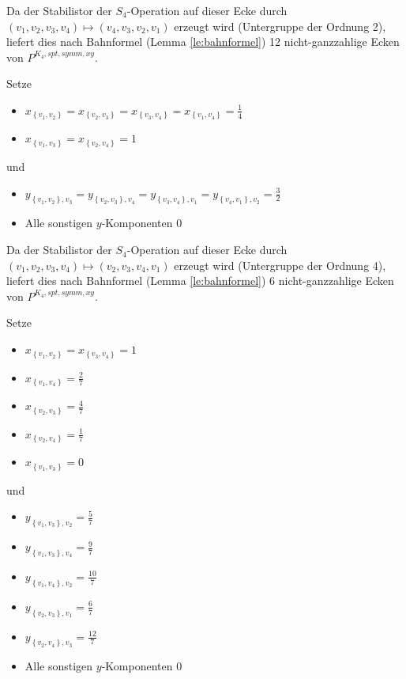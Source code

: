 \documentclass[10p,a4paper,BCOR = 12mm, DIV=15]{scrbook}
\begin{document}
{\begin{Bem}
Da der Stabilistor der $S_4$-Operation auf dieser Ecke durch $\left(v_1, v_2, v_3, v_4\right) \mapsto \left(v_4, v_3, v_2, v_1\right)$ erzeugt wird (Untergruppe der Ordnung 2), liefert dies nach Bahnformel (Lemma \ref{le:bahnformel}) 12 nicht-ganzzahlige Ecken von $P^{K_4, spt, symm, xy}$.
\end{Bem}

\begin{Bem}
Setze
\begin{itemize}
\item $x_{\left\{v_1, v_2\right\}} = x_{\left\{v_2, v_3\right\}} = x_{\left\{v_3, v_4\right\}} = x_{\left\{v_1, v_4\right\}} = \frac{1}{4}$
\item $x_{\left\{v_1, v_3\right\}} = x_{\left\{v_2, v_4\right\}} = 1$
\end{itemize}
und
\begin{itemize}
\item  $y_{\left\{v_1, v_2\right\}, v_3} = y_{\left\{v_2, v_3\right\}, v_4} = y_{\left\{v_3, v_4\right\}, v_1} = y_{\left\{v_4, v_1\right\}, v_2} = \frac{3}{2}$
\item Alle sonstigen $y$-Komponenten $0$
\end{itemize}

Da der Stabilistor der $S_4$-Operation auf dieser Ecke durch $\left(v_1, v_2, v_3, v_4\right) \mapsto \left(v_2, v_3, v_4, v_1\right)$ erzeugt wird (Untergruppe der Ordnung 4), liefert dies nach Bahnformel (Lemma \ref{le:bahnformel}) 6 nicht-ganzzahlige Ecken von $P^{K_4, spt, symm, xy}$.
\end{Bem}

\begin{Bem}
Setze
\begin{itemize}
\item $x_{\left\{v_1, v_2\right\}} = x_{\left\{v_3, v_4\right\}} = 1$
\item $x_{\left\{v_1, v_4\right\}} = \frac{2}{7}$
\item $x_{\left\{v_2, v_3\right\}} = \frac{4}{7}$
\item $x_{\left\{v_2, v_4\right\}} = \frac{1}{7}$
\item $x_{\left\{v_1, v_3\right\}} = 0$
\end{itemize}
und
\begin{itemize}
\item $y_{\left\{v_1, v_3\right\}, v_2} = \frac{5}{7}$
\item $y_{\left\{v_1, v_3\right\}, v_4} = \frac{9}{7}$
\item $y_{\left\{v_1, v_4\right\}, v_2} = \frac{10}{7}$
\item $y_{\left\{v_2, v_3\right\}, v_1} = \frac{6}{7}$
\item $y_{\left\{v_2, v_4\right\}, v_3} = \frac{12}{7}$
\item Alle sonstigen $y$-Komponenten $0$
\end{itemize}


\end{Bem}}
\end{document}
